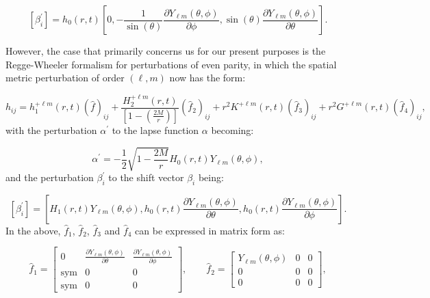 \documentclass{article}
\begin{document}
\begin{equation}
\left[ \beta_{i}^{\prime} \right] = h_{0} \left( r, t \right) \left[ 0, - \frac{1}{\sin \left( \theta \right)} \frac{\partial Y_{\ell m} \left( \theta, \phi \right)}{\partial \phi}, \sin \left( \theta \right) \frac{\partial Y_{\ell m} \left( \theta, \phi \right)}{\partial \theta} \right].
\end{equation}

However, the case that primarily concerns us for our present purposes is the Regge-Wheeler formalism for perturbations of even parity, in which the spatial metric perturbation of order ${\left( \ell, m \right)}$ now has the form:

\begin{equation}
h_{i j} = h_{1}^{+ \ell m} \left( r, t \right) \left( \hat{f} \right)_{i j} + \frac{H_{2}^{+ \ell m} \left( r, t \right)}{\left[ 1 - \left( \frac{2M}{r} \right) \right]} \left( \hat{f}_2 \right)_{i j} + r^2 K^{+ \ell m} \left( r, t \right) \left( \hat{f}_3 \right)_{i j} + r^2 G^{+ \ell m} \left( r, t \right) \left( \hat{f}_4 \right)_{i j},
\end{equation}
with the perturbation ${\alpha^{\prime}}$ to the lapse function ${\alpha}$ becoming:

\begin{equation}
\alpha^{\prime} = - \frac{1}{2} \sqrt{1 - \frac{2M}{r}} H_0 \left( r, t \right) Y_{\ell m} \left( \theta, \phi \right),
\end{equation}
and the perturbation ${\beta_{i}^{\prime}}$ to the shift vector ${\beta_i}$ being:

\begin{equation}
\left[ \beta_{i}^{\prime} \right] = \left[ H_1 \left( r, t \right) Y_{\ell m} \left( \theta, \phi \right), h_0 \left( r, t \right) \frac{\partial Y_{\ell m} \left( \theta, \phi \right)}{\partial \theta}, h_0 \left( r, t \right) \frac{\partial Y_{\ell m} \left( \theta, \phi \right)}{\partial \phi} \right].
\end{equation}
In the above, ${\hat{f}_1}$, ${\hat{f}_2}$, ${\hat{f}_3}$ and ${\hat{f}_4}$ can be expressed in matrix form as:

\begin{equation}
\hat{f}_1 = \begin{bmatrix}
0 & \frac{\partial Y_{\ell m} \left( \theta, \phi \right)}{\partial \theta} & \frac{\partial Y_{\ell m} \left( \theta, \phi \right)}{\partial \phi}\\
\mathrm{sym} & 0 & 0\\
\mathrm{sym} & 0 & 0
\end{bmatrix}, \qquad \hat{f}_2 = \begin{bmatrix}
Y_{\ell m} \left( \theta, \phi \right) & 0 & 0\\
0 & 0 & 0\\
0 & 0 & 0
\end{bmatrix},
\end{equation}
\end{document}
